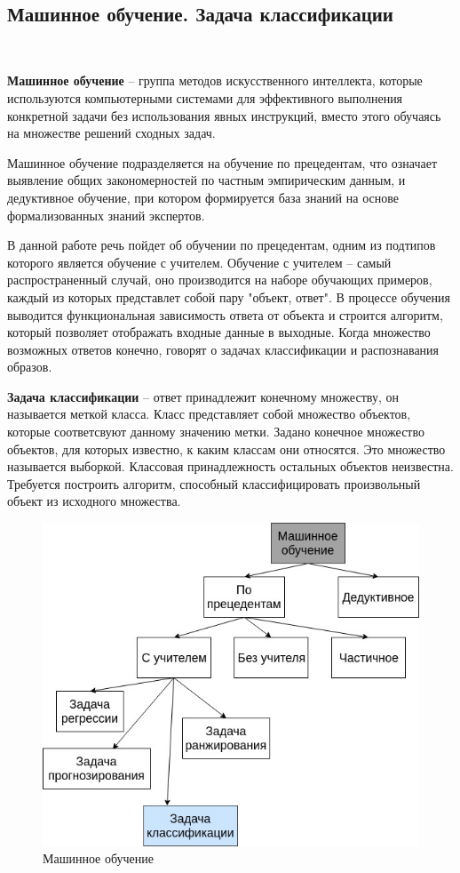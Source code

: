 \
\subsection{Машинное обучение. Задача классификации}
\

\textbf{Машинное обучение} – группа методов искусственного интеллекта, которые используются компьютерными системами для эффективного выполнения конкретной задачи без использования явных инструкций, вместо этого обучаясь на множестве решений сходных задач.

Машинное обучение подразделяется на обучение по прецедентам, что означает выявление общих закономерностей по частным эмпирическим данным, и дедуктивное обучение, при котором формируется база знаний на основе формализованных знаний экспертов.

В данной работе речь пойдет об обучении по прецедентам, одним из подтипов которого является обучение с учителем. Обучение с учителем – самый распространенный случай, оно производится на наборе обучающих примеров, каждый из которых представлет собой пару "объект, ответ". В процессе обучения выводится функциональная зависимость ответа от объекта и строится алгоритм, который позволяет отображать входные данные в выходные. Когда множество возможных ответов конечно, говорят о задачах классификации и распознавания образов.

\textbf{Задача классификации} – ответ принадлежит конечному множеству, он называется меткой класса. Класс представляет собой множество объектов, которые соответсвуют данному значению метки. Задано конечное множество объектов, для которых известно, к каким классам они относятся. Это множество называется выборкой. Классовая принадлежность остальных объектов неизвестна. Требуется построить алгоритм, способный классифицировать произвольный объект из исходного множества.

  \begin{figure}[h!]
    \centering
    \setlength{\fboxsep}{5pt}
    \includegraphics[width=.9\textwidth]{img/ml}
    \vspace*{6pt}
    \caption{Машинное обучение}\label{fig:project-tree}
  \end{figure}

